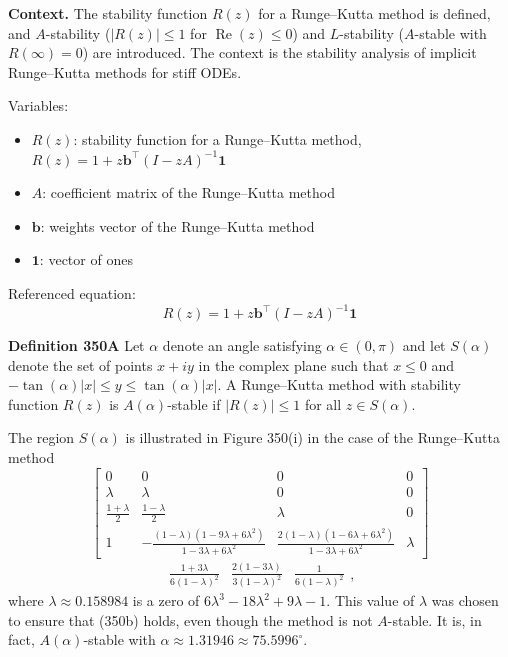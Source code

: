 \noindent\textbf{Context.}
The stability function $R(z)$ for a Runge--Kutta method is defined, and $A$-stability ($|R(z)| \le 1$ for $\operatorname{Re}(z) \le 0$) and $L$-stability ($A$-stable with $R(\infty)=0$) are introduced. The context is the stability analysis of implicit Runge--Kutta methods for stiff ODEs.

Variables:
\begin{itemize}
    \item $R(z)$: stability function for a Runge--Kutta method, $R(z) = 1 + z\mathbf{b}^\top (I - zA)^{-1} \mathbf{1}$
    \item $A$: coefficient matrix of the Runge--Kutta method
    \item $\mathbf{b}$: weights vector of the Runge--Kutta method
    \item $\mathbf{1}$: vector of ones
\end{itemize}

Referenced equation:
\begin{equation}
R(z) = 1 + z\mathbf{b}^\top (I - zA)^{-1} \mathbf{1}
\tag{350a}
\end{equation}

  \label{def:350A}
  \uses{}
\textbf{Definition 350A} Let $\alpha$ denote an angle satisfying $\alpha \in (0, \pi)$ and let $S(\alpha)$ denote the set of points $x + iy$ in the complex plane such that $x \leq 0$ and $-\tan(\alpha)|x| \leq y \leq \tan(\alpha)|x|$. A Runge--Kutta method with stability function $R(z)$ is $A(\alpha)$-stable if $|R(z)| \leq 1$ for all $z \in S(\alpha)$.

The region $S(\alpha)$ is illustrated in Figure 350(i) in the case of the Runge--Kutta method
\[
\left[\begin{array}{cccc}
0 & 0 & 0 & 0 \\
\lambda & \lambda & 0 & 0 \\
\frac{1+\lambda}{2} & \frac{1-\lambda}{2} & \lambda & 0 \\
1 & -\frac{(1-\lambda)(1-9\lambda+6\lambda^{2})}{1-3\lambda+6\lambda^{2}} & \frac{2(1-\lambda)(1-6\lambda+6\lambda^{2})}{1-3\lambda+6\lambda^{2}} & \lambda
\end{array}\right]
\]
\[
\begin{array}{cccc}
\frac{1+3\lambda}{6(1-\lambda)^{2}} & \frac{2(1-3\lambda)}{3(1-\lambda)^{2}} & \frac{1}{6(1-\lambda)^{2}}
\end{array},
\]
where $\lambda \approx 0.158984$ is a zero of $6\lambda^{3} - 18\lambda^{2} + 9\lambda - 1$. This value of $\lambda$ was chosen to ensure that (350b) holds, even though the method is not $A$-stable. It is, in fact, $A(\alpha)$-stable with $\alpha \approx 1.31946 \approx 75.5996^{\circ}$.

